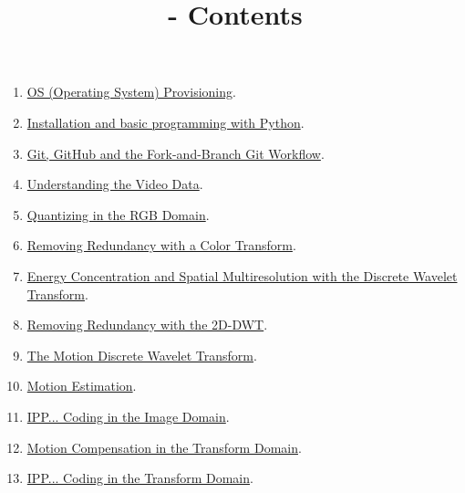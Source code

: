 
\title{\SM - Contents}

\maketitle

\begin{enumerate}
\item \href{https://sistemas-multimedia.github.io/milestones/01-provisioning/}{OS (Operating System) Provisioning}.
\item \href{https://sistemas-multimedia.github.io/milestones/02-python/}{Installation and basic programming with Python}.
\item \href{https://sistemas-multimedia.github.io/milestones/03-git/}{Git, GitHub and the Fork-and-Branch Git Workflow}.
\item \href{https://sistemas-multimedia.github.io/milestones/04-the_data/}{Understanding the Video Data}.
\item \href{https://sistemas-multimedia.github.io/milestones/05-quantization/}{Quantizing in the RGB Domain}.
\item \href{https://sistemas-multimedia.github.io/milestones/06-color_transform/}{Removing Redundancy with a Color Transform}.
\item \href{https://sistemas-multimedia.github.io/milestones/07-DWT/}{Energy Concentration and Spatial Multiresolution with the Discrete Wavelet Transform}.
\item \href{https://sistemas-multimedia.github.io/milestones/08-2D-DWT/}{Removing Redundancy with the 2D-DWT}.
\item \href{https://sistemas-multimedia.github.io/milestones/09-MDWT/}{The Motion Discrete Wavelet Transform}.
\item \href{https://sistemas-multimedia.github.io/milestones/10-ME/}{Motion Estimation}.
\item \href{https://sistemas-multimedia.github.io/milestones/11-image_domain_IPP/}{IPP... Coding in the Image Domain}.
\item \href{https://sistemas-multimedia.github.io/milestones/12-transform_domain_MC/}{Motion Compensation in the Transform Domain}.
\item \href{https://sistemas-multimedia.github.io/milestones/13-transform_domain_IPP/}{IPP... Coding in the Transform Domain}.

\end{enumerate}
